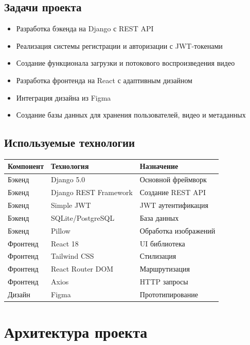 \documentclass[12pt]{article}
\begin{document}
\subsection{Задачи проекта}

\begin{itemize}
    \item Разработка бэкенда на Django с REST API
    \item Реализация системы регистрации и авторизации с JWT-токенами
    \item Создание функционала загрузки и потокового воспроизведения видео
    \item Разработка фронтенда на React с адаптивным дизайном
    \item Интеграция дизайна из Figma
    \item Создание базы данных для хранения пользователей, видео и метаданных
\end{itemize}

\subsection{Используемые технологии}

\begin{longtable}{|p{4cm}|p{4cm}|p{6cm}|}
\hline
\textbf{Компонент} & \textbf{Технология} & \textbf{Назначение} \\
\hline
Бэкенд & Django 5.0 & Основной фреймворк \\
\hline
Бэкенд & Django REST Framework & Создание REST API \\
\hline
Бэкенд & Simple JWT & JWT аутентификация \\
\hline
Бэкенд & SQLite/PostgreSQL & База данных \\
\hline
Бэкенд & Pillow & Обработка изображений \\
\hline
Фронтенд & React 18 & UI библиотека \\
\hline
Фронтенд & Tailwind CSS & Стилизация \\
\hline
Фронтенд & React Router DOM & Маршрутизация \\
\hline
Фронтенд & Axios & HTTP запросы \\
\hline
Дизайн & Figma & Прототипирование \\
\hline
\end{longtable}

\newpage

\section{Архитектура проекта}
\end{document}
